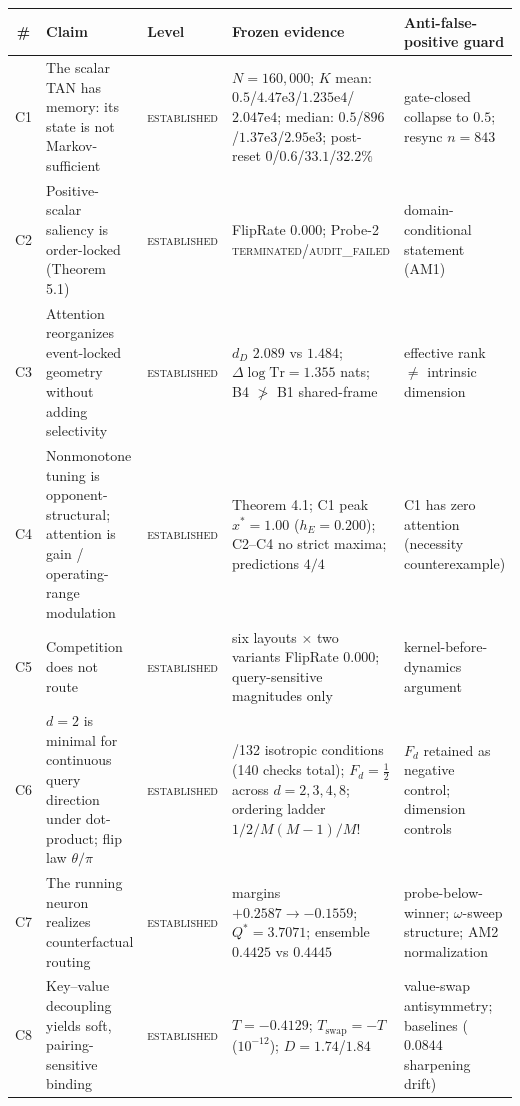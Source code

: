 \begin{table}[p]
\centering
\footnotesize
\renewcommand{\arraystretch}{0.88}
\setlength{\tabcolsep}{3.2pt}
\begin{tabular}{@{}c>{\raggedright\arraybackslash}p{3.8cm}>{\raggedright\arraybackslash}p{2.2cm}>{\raggedright\arraybackslash}p{4.6cm}>{\raggedright\arraybackslash}p{3.0cm}@{}}
\toprule
\# & Claim & Level & Frozen evidence & Anti-false-positive guard \\
\midrule
C1 & The scalar TAN has memory: its state is not Markov-sufficient &
\textsc{established} & $N=160{,}000$; $K$ mean: $0.5$/$4.47\mathrm{e}3$/$1.235\mathrm{e}4$/$2.047\mathrm{e}4$; median: $0.5$/$896$/$1.37\mathrm{e}3$/$2.95\mathrm{e}3$; post-reset $0$/$0.6$/$33.1$/$32.2\%$
& gate-closed collapse to $0.5$; resync $n=843$ \\
C2 & Positive-scalar saliency is order-locked (Theorem 5.1) &
\textsc{established} & FlipRate $0.000$; Probe-2 \textsc{terminated}/\textsc{audit\_failed} & domain-conditional statement (AM1) \\
C3 & Attention reorganizes event-locked geometry without adding selectivity &
\textsc{established} & $d_D$ $2.089$ vs $1.484$; $\Delta\log\mathrm{Tr}=1.355$ nats; B4 $\not>$ B1 shared-frame & effective rank $\neq$ intrinsic dimension \\
C4 & Nonmonotone tuning is opponent-structural; attention is gain / operating-range modulation &
\textsc{established} & Theorem 4.1; C1 peak $x^*=1.00$ ($h_E=0.200$); C2--C4 no strict maxima; predictions $4/4$ & C1 has zero attention (necessity counterexample) \\
C5 & Competition does not route &
\textsc{established} & six layouts $\times$ two variants FlipRate $0.000$; query-sensitive magnitudes only & kernel-before-dynamics argument \\
C6 & $d=2$ is minimal for continuous query direction under dot-product; flip law $\theta/\pi$ &
\textsc{established} & 132/132 isotropic conditions (140 checks total); $F_d=\tfrac12$ across $d=2,3,4,8$; ordering ladder $1/2/M(M-1)/M!$ & $F_d$ retained as negative control; dimension controls \\
C7 & The running neuron realizes counterfactual routing &
\textsc{established} & margins $+0.2587\to-0.1559$; $Q^*=3.7071$; ensemble $0.4425$ vs $0.4445$ & probe-below-winner; $\omega$-sweep structure; AM2 normalization \\
C8 & Key--value decoupling yields soft, pairing-sensitive binding &
\textsc{established} & $T=-0.4129$; $T_{\mathrm{swap}}=-T$ ($10^{-12}$); $D=1.74$/$1.84$ & value-swap antisymmetry; baselines ($0.0844$ sharpening drift) \\

\end{tabular}
\end{table}
